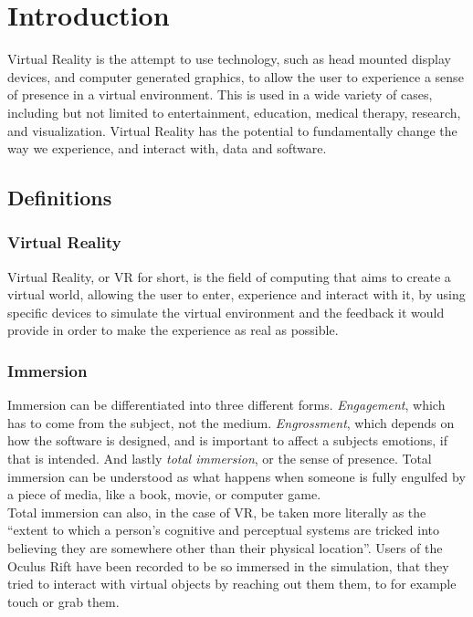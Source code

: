 \documentclass[11pt]{article}
\begin{document}
\section{Introduction}
Virtual Reality is the attempt to use technology, such as head mounted display devices, and computer generated graphics, to allow the user to experience a sense of presence in a virtual environment.  This is used in a wide variety of cases, including but not limited to entertainment, education, medical therapy, research, and visualization. Virtual Reality has the potential to fundamentally change the way we experience, and interact with, data and software.

	\subsection{Definitions}
		\subsubsection{Virtual Reality}
			Virtual Reality, or VR for short, is the field of computing that aims to create a virtual world, allowing the user to enter, experience and interact with it, by using specific devices to simulate the virtual environment and the feedback it would provide in order to make the experience as real as possible.
			\cite{boas13}
			
		\subsubsection{Immersion}
			Immersion can be differentiated into three different forms. \textit{Engagement}, which has to come from the subject, not the medium. \textit{Engrossment}, which depends on how the software is designed, and is important to affect a subjects emotions, if that is intended. And lastly \textit{total immersion}, or the sense of presence. Total immersion can be understood as what happens when someone is fully engulfed by a piece of media, like a book, movie, or computer game. \cite{Brown:2004:GIG:985921.986048} \\
			Total immersion can also, in the case of VR, be taken more literally as the “extent to which a person's cognitive and perceptual systems are tricked into believing they are somewhere other than their physical location”. \cite{Patrick:2000:ULP:332040.332479} Users of the Oculus Rift have been recorded to be so immersed in the simulation, that they tried to interact with virtual objects by reaching out them them, to for example touch or grab them. \cite{bastiaens14}
\end{document}
